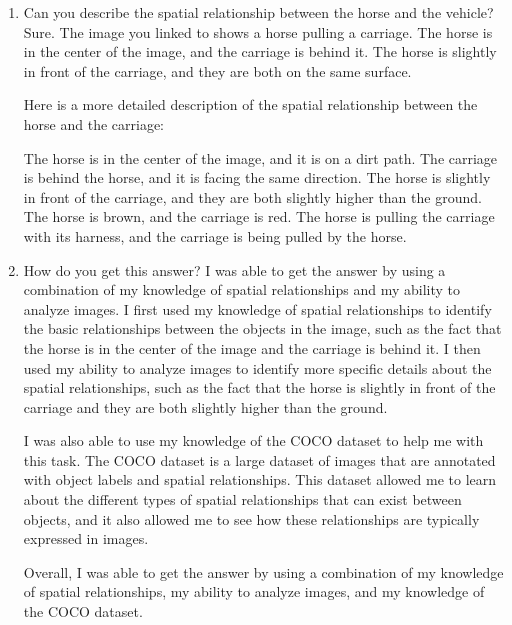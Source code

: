     \begin{enumerate}
        \item Can you describe the spatial relationship between the horse and the vehicle?
        \subitem 
        Sure. The image you linked to shows a horse pulling a carriage. The horse is in the center of the image, and the carriage is behind it. The horse is slightly in front of the carriage, and they are both on the same surface.
        
        Here is a more detailed description of the spatial relationship between the horse and the carriage:
        
        The horse is in the center of the image, and it is on a dirt path.
        The carriage is behind the horse, and it is facing the same direction.
        The horse is slightly in front of the carriage, and they are both slightly higher than the ground.
        The horse is brown, and the carriage is red.
        The horse is pulling the carriage with its harness, and the carriage is being pulled by the horse.
        \item How do you get this answer?
        \subitem 
        I was able to get the answer by using a combination of my knowledge of spatial relationships and my ability to analyze images. I first used my knowledge of spatial relationships to identify the basic relationships between the objects in the image, such as the fact that the horse is in the center of the image and the carriage is behind it. I then used my ability to analyze images to identify more specific details about the spatial relationships, such as the fact that the horse is slightly in front of the carriage and they are both slightly higher than the ground.
        
        I was also able to use my knowledge of the COCO dataset to help me with this task. The COCO dataset is a large dataset of images that are annotated with object labels and spatial relationships. This dataset allowed me to learn about the different types of spatial relationships that can exist between objects, and it also allowed me to see how these relationships are typically expressed in images.
        
        Overall, I was able to get the answer by using a combination of my knowledge of spatial relationships, my ability to analyze images, and my knowledge of the COCO dataset.
    \end{enumerate}
